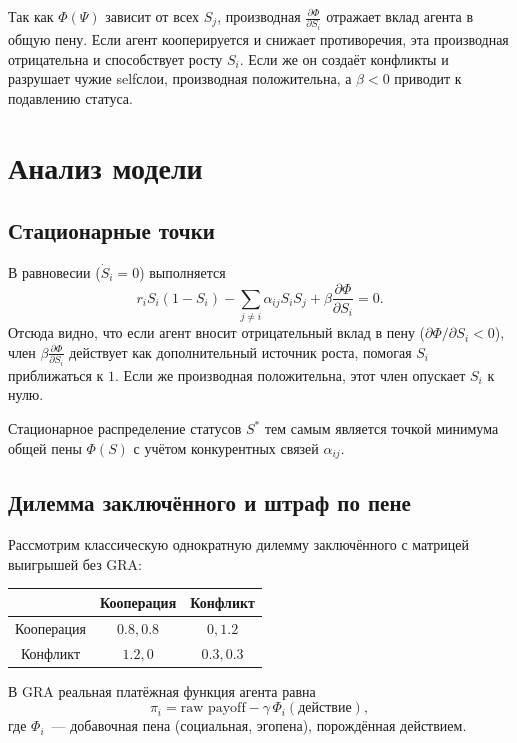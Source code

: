 \documentclass[11pt,a4paper]{article}
\begin{document}
Так как $\Phi(\Psi)$ зависит от всех $S_j$, производная $\frac{\partial\Phi}{\partial S_i}$ отражает вклад агента в общую пену.
Если агент кооперируется и снижает противоречия, эта производная отрицательна и способствует росту $S_i$.
Если же он создаёт конфликты и разрушает чужие self\textendash слои, производная положительна, а $\beta<0$ приводит к подавлению статуса.

\section{Анализ модели}

\subsection{Стационарные точки}

В равновесии ($\dot S_i=0$) выполняется
\begin{equation}
r_i S_i(1-S_i) - \sum_{j\neq i}\alpha_{ij} S_i S_j + \beta\frac{\partial\Phi}{\partial S_i} = 0.
\end{equation}
Отсюда видно, что если агент вносит отрицательный вклад в пену ($\partial\Phi/\partial S_i < 0$), член $\beta\frac{\partial\Phi}{\partial S_i}$ действует как дополнительный источник роста, помогая $S_i$ приближаться к $1$.
Если же производная положительна, этот член опускает $S_i$ к нулю.

Стационарное распределение статусов $S^*$ тем самым является точкой минимума общей пены $\Phi(S)$ с учётом конкурентных связей $\alpha_{ij}$.

\subsection{Дилемма заключённого и штраф по пене}

Рассмотрим классическую однократную дилемму заключённого с матрицей выигрышей без GRA:

\begin{center}
\begin{tabular}{c|cc}
 & Кооперация & Конфликт \\
\hline
Кооперация & $0.8, 0.8$ & $0, 1.2$ \\
Конфликт   & $1.2, 0$   & $0.3, 0.3$ \\
\end{tabular}
\end{center}

В GRA реальная платёжная функция агента равна
\begin{equation}
\pi_i = \text{raw payoff} - \gamma\,\Phi_i(\text{действие}),
\end{equation}
где $\Phi_i$~--- добавочная пена (социальная, эго\textendash пена), порождённая действием.
\end{document}
